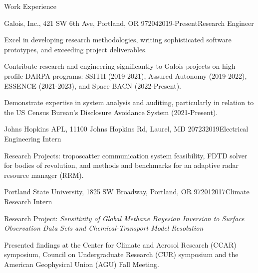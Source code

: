 \documentclass{resume}
\begin{document}
\begin{rSection}{Work Experience}
\begin{rSubsection}{Galois, Inc., 421 SW 6th Ave, Portland, OR 97204}{2019-Present}{Research Engineer}{}
\item Excel in developing research methodologies, writing sophisticated software prototypes, and exceeding project deliverables.
\item Contribute research and engineering significantly to Galois projects on high-profile DARPA programs: SSITH (2019-2021), Assured Autonomy (2019-2022), ESSENCE (2021-2023), and Space BACN (2022-Present).
\item Demonstrate expertise in system analysis and auditing, particularly in relation to the US Census Bureau's Disclosure Avoidance System (2021-Present).
\end{rSubsection}

\begin{rSubsection}{Johns Hopkins APL, 11100 Johns Hopkins Rd, Laurel, MD 20723}{2019}{Electrical Engineering Intern}{}
\item Research Projects: troposcatter communication system feasibility, FDTD solver for bodies of revolution, and methods and benchmarks for an adaptive radar resource manager (RRM).
\end{rSubsection}


\begin{rSubsection}{Portland State University, 1825 SW Broadway, Portland, OR 97201}{2017}{Climate Research Intern}{}
\item Research Project: \textit{Sensitivity of Global Methane Bayesian Inversion to Surface Observation Data Sets and Chemical-Transport Model Resolution}
\item Presented findings at the Center for Climate and Aerosol Research (CCAR) symposium,
Council on Undergraduate Research (CUR) symposium and the American Geophysical
Union (AGU) Fall Meeting.
\end{rSubsection}
\end{rSection}
\end{document}
